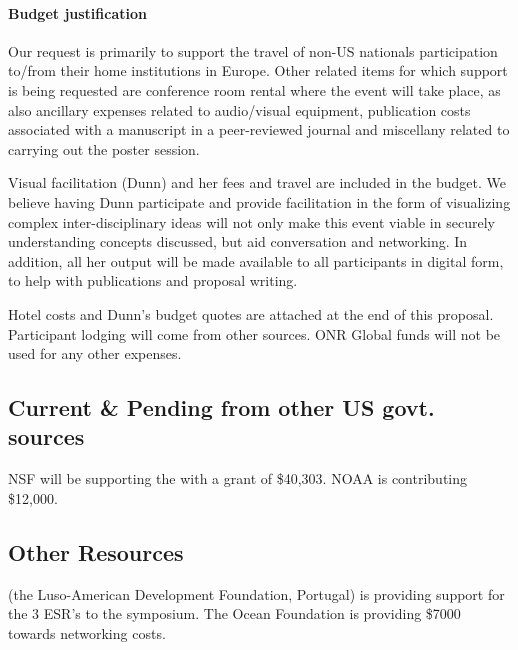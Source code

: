 \paragraph{Budget justification} Our request is primarily to support
the travel of non-US nationals participation to/from their home
institutions in Europe. Other related items for which support is being
requested are conference room rental where the event will take place,
as also ancillary expenses related to audio/visual equipment,
publication costs associated with a manuscript in a peer-reviewed
journal and miscellany related to carrying out the poster session.

Visual facilitation (Dunn) and her fees and travel are included in the
budget. We believe having Dunn participate and provide facilitation in
the form of visualizing complex inter-disciplinary ideas will not only
make this event viable in securely understanding concepts discussed,
but aid conversation and networking. In addition, all her output will
be made available to all participants in digital form, to help with
publications and proposal writing.

Hotel costs and Dunn's budget quotes are attached at the end of this
proposal. Participant lodging will come from other sources. ONR Global
funds will not be used for any other expenses.

\subsection{Current \& Pending from other US govt. sources}

NSF will be supporting the \symp with a grant of \$40,303. NOAA is
contributing \$12,000.

\subsection{Other Resources}

\fla (the Luso-American Development Foundation, Portugal) is providing
support for the 3 ESR's to the symposium. The Ocean Foundation is
providing \$7000 towards networking costs.
